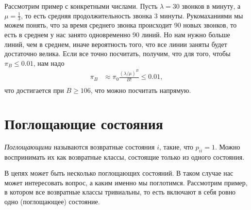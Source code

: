\documentclass[12pt]{article}
\begin{document}
Рассмотрим пример с конкретными числами. Пусть $\lambda = 30$ звонков в минуту, а $\mu = \frac{1}{3}$, то есть средняя продолжительность звонка $3$ минуты. Рукомаханиями мы можем понять, что за время среднего звонка происходит 90 новых звонков, то есть в среднем у нас занято одновременно 90 линий. Но нам нужно больше линий, чем в среднем, иначе вероятность того, что все линии заняты будет достаточно велика. Если все точно посчитать, получим, что для того, чтобы $\pi_B \le 0.01$, нам надо
\begin{align*}
  \pi_B &\approx \pi_0 \frac{(\lambda/\mu)^B}{B!} \le 0.01, \\
\end{align*} 
что достигается при $B \ge 106$, что можно посчитать напрямую.

\section{Поглощающие состояния}

\emph{Поглощающими} называются возвратные состояния $i$, такие, что $p_{ii} = 1$. Можно воспринимать их как возвратные классы, состоящие только из одного состояния. 

В цепях может быть несколько поглощающих состояний. В таком случае нас может интересовать вопрос, а каким именно мы поглотимся. Рассмотрим пример, в котором все возвратные классы тривиальны, то есть включают в себя ровно одно (поглощающее) состояние.

\begin{center}
\end{center}
\end{document}
